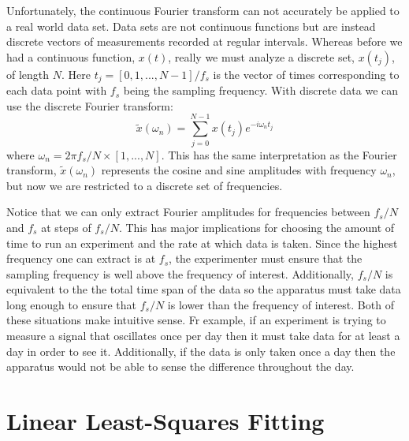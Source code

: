 \documentclass{book}
\begin{document}
Unfortunately, the continuous Fourier transform can not accurately be applied to a real world data set. Data sets are not continuous functions but are instead discrete vectors of measurements recorded at regular intervals. Whereas before we had a continuous function, $x(t)$, really we must analyze a discrete set, $x(t_j)$, of length $N$. Here $t_j= [0, 1, ..., N-1]/f_s$ is the vector of times corresponding to each data point with $f_s$ being the sampling frequency. With discrete data we can use the discrete Fourier transform:
\begin{equation}
\tilde x (\omega_n) = \sum_{j=0}^{N-1} x(t_j) e^{-i \omega_n t_j} \label{DFT}
\end{equation}
where $\omega_n= 2\pi f_s/N \times [1, ..., N]$. This has the same interpretation as the Fourier transform, $\tilde x (\omega_n)$ represents the cosine and sine amplitudes with frequency $\omega_n$, but now we are restricted to a discrete set of frequencies. 

Notice that we can only extract Fourier amplitudes for frequencies between $f_s/N$ and $f_s$ at steps of $f_s/N$. This has major implications for choosing the amount of time to run an experiment and the rate at which data is taken. Since the highest frequency one can extract is at $f_s$, the experimenter must ensure that the sampling frequency is well above the frequency of interest. Additionally, $f_s/N$ is equivalent to the the total time span of the data so the apparatus must take data long enough to ensure that $f_s/N$ is lower than the frequency of interest. Both of these situations make intuitive sense. Fr example, if an experiment is trying to measure a signal that oscillates once per day then it must take data for at least a day in order to see it. Additionally, if the data is only taken once a day then the apparatus would not be able to sense the difference throughout the day.

\section{Linear Least-Squares Fitting}



\end{document}
